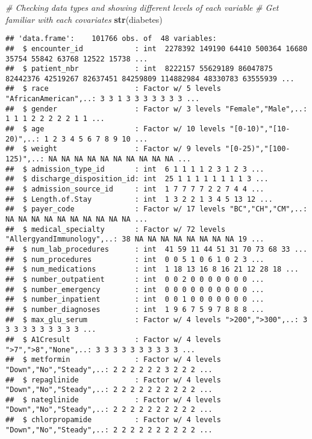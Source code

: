 \documentclass[
]{article}
\newenvironment{Shaded}{\begin{snugshade}}{\end{snugshade}}
\newcommand{\CommentTok}[1]{\textcolor[rgb]{0.56,0.35,0.01}{\textit{#1}}}
\newcommand{\KeywordTok}[1]{\textcolor[rgb]{0.13,0.29,0.53}{\textbf{#1}}}
\newcommand{\NormalTok}[1]{#1}
\begin{document}
\begin{Shaded}
\begin{Highlighting}[]
\CommentTok{# Checking data types and showing different levels of each variable}
\CommentTok{# Get familiar with each covariates}
\KeywordTok{str}\NormalTok{(diabetes)}
\end{Highlighting}
\end{Shaded}

\begin{verbatim}
## 'data.frame':    101766 obs. of  48 variables:
##  $ encounter_id            : int  2278392 149190 64410 500364 16680 35754 55842 63768 12522 15738 ...
##  $ patient_nbr             : int  8222157 55629189 86047875 82442376 42519267 82637451 84259809 114882984 48330783 63555939 ...
##  $ race                    : Factor w/ 5 levels "AfricanAmerican",..: 3 3 1 3 3 3 3 3 3 3 ...
##  $ gender                  : Factor w/ 3 levels "Female","Male",..: 1 1 1 2 2 2 2 2 1 1 ...
##  $ age                     : Factor w/ 10 levels "[0-10)","[10-20)",..: 1 2 3 4 5 6 7 8 9 10 ...
##  $ weight                  : Factor w/ 9 levels "[0-25)","[100-125)",..: NA NA NA NA NA NA NA NA NA NA ...
##  $ admission_type_id       : int  6 1 1 1 1 2 3 1 2 3 ...
##  $ discharge_disposition_id: int  25 1 1 1 1 1 1 1 1 3 ...
##  $ admission_source_id     : int  1 7 7 7 7 2 2 7 4 4 ...
##  $ Length.of.Stay          : int  1 3 2 2 1 3 4 5 13 12 ...
##  $ payer_code              : Factor w/ 17 levels "BC","CH","CM",..: NA NA NA NA NA NA NA NA NA NA ...
##  $ medical_specialty       : Factor w/ 72 levels "AllergyandImmunology",..: 38 NA NA NA NA NA NA NA NA 19 ...
##  $ num_lab_procedures      : int  41 59 11 44 51 31 70 73 68 33 ...
##  $ num_procedures          : int  0 0 5 1 0 6 1 0 2 3 ...
##  $ num_medications         : int  1 18 13 16 8 16 21 12 28 18 ...
##  $ number_outpatient       : int  0 0 2 0 0 0 0 0 0 0 ...
##  $ number_emergency        : int  0 0 0 0 0 0 0 0 0 0 ...
##  $ number_inpatient        : int  0 0 1 0 0 0 0 0 0 0 ...
##  $ number_diagnoses        : int  1 9 6 7 5 9 7 8 8 8 ...
##  $ max_glu_serum           : Factor w/ 4 levels ">200",">300",..: 3 3 3 3 3 3 3 3 3 3 ...
##  $ A1Cresult               : Factor w/ 4 levels ">7",">8","None",..: 3 3 3 3 3 3 3 3 3 3 ...
##  $ metformin               : Factor w/ 4 levels "Down","No","Steady",..: 2 2 2 2 2 2 3 2 2 2 ...
##  $ repaglinide             : Factor w/ 4 levels "Down","No","Steady",..: 2 2 2 2 2 2 2 2 2 2 ...
##  $ nateglinide             : Factor w/ 4 levels "Down","No","Steady",..: 2 2 2 2 2 2 2 2 2 2 ...
##  $ chlorpropamide          : Factor w/ 4 levels "Down","No","Steady",..: 2 2 2 2 2 2 2 2 2 2 ...

\end{verbatim}
\end{document}
